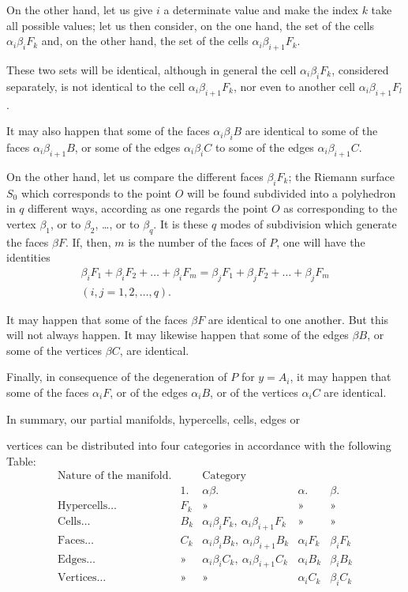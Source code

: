 \documentclass{article}
\begin{document}
On the other hand, let us give $i$ a determinate value and make the index $k$ take all possible values; let us then consider, on the one hand, the set of the cells $\alpha_{i}\beta_{i}F_{k}$ and, on the other hand, the set of the cells $\alpha_{i}\beta_{i+1}F_{k}$.

These two sets will be identical, although in general the cell $\alpha_{i}\beta_{i}F_{k}$, considered separately, is not identical to the cell $\alpha_{i}\beta_{i+1}F_{k}$, nor even to another cell $\alpha_{i}\beta_{i+1}F_{l}$.

It may also happen that some of the faces $\alpha_{i}\beta_{i}B$ are identical to some of the faces $\alpha_{i}\beta_{i+1}B$, or some of the edges $\alpha_{i}\beta_{i}C$ to some of the edges $\alpha_{i}\beta_{i+1}C$.

On the other hand, let us compare the different faces $\beta_{i}F_{k}$; the Riemann surface $S_{0}$ which corresponds to the point $O$ will be found subdivided into a polyhedron in $q$ different ways, according as one regards the point $O$ as corresponding to the vertex $\beta_{1}$, or to $\beta_{2}$, \ldots, or to $\beta_{q}$. It is these $q$ modes of subdivision which generate the faces $\beta F$. If, then, $m$ is the number of the faces of $P$, one will have the identities
\[ \begin{gathered} \beta_{i}F_{1} + \beta_{i}F_{2} + \ldots + \beta_{i}F_{m} = \beta_{j}F_{1} + \beta_{j}F_{2} + \ldots + \beta_{j}F_{m} \\ (i, j = 1, 2, \ldots, q). \end{gathered} \tag{2} \]

It may happen that some of the faces $\beta F$ are identical to one another. But this will not always happen. It may likewise happen that some of the edges $\beta B$, or some of the vertices $\beta C$, are identical.

Finally, in consequence of the degeneration of $P$ for $y = A_{i}$, it may happen that some of the faces $\alpha_{i}F$, or of the edges $\alpha_{i}B$, or of the vertices $\alpha_{i}C$ are identical.

In summary, our partial manifolds, hypercells, cells, edges or

vertices can be distributed into four categories in accordance with the following Table:
\[ \begin{matrix} \text{Nature of the manifold.} & & \text{Category} & & \\[1ex] & 1. & \alpha\beta. & \alpha. & \beta. \\[1ex] \text{Hypercells}\ldots & F_{k} & \text{»} & \text{»} & \text{»} \\[1ex] \text{Cells}\ldots & B_{k} & \alpha_{i}\beta_{i}F_{k},\ \alpha_{i}\beta_{i+1}F_{k} & \text{»} & \text{»} \\[1ex] \text{Faces}\ldots & C_{k} & \alpha_{i}\beta_{i}B_{k},\ \alpha_{i}\beta_{i+1}B_{k} & \alpha_{i}F_{k} & \beta_{i}F_{k} \\[1ex] \text{Edges}\ldots & \text{»} & \alpha_{i}\beta_{i}C_{k},\ \alpha_{i}\beta_{i+1}C_{k} & \alpha_{i}B_{k} & \beta_{i}B_{k} \\[1ex] \text{Vertices}\ldots & \text{»} & \text{»} & \alpha_{i}C_{k} & \beta_{i}C_{k} \end{matrix} \]
\end{document}
